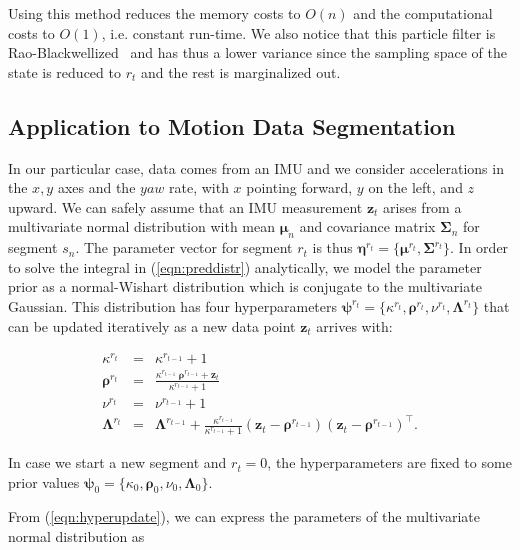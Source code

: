 Using this method reduces the memory costs to $O(n)$ and the computational costs
to $O(1)$, i.e. constant run-time. We also notice that this particle filter is
Rao-Blackwellized~\cite{casella96rao} and has thus a lower variance since the
sampling space of the state is reduced to $r_t$ and the rest is marginalized out.

\subsection{Application to Motion Data Segmentation}
In our particular case, data comes from an IMU and we consider accelerations in
the $x,y$ axes and the $yaw$ rate, with $x$ pointing forward, $y$ on the left,
and $z$ upward. We can safely assume that an IMU measurement $\mathbf{z}_t$
arises from a multivariate normal distribution with mean $\boldsymbol{\mu}_n$
and covariance matrix $\boldsymbol{\Sigma}_n$ for segment $s_n$. The parameter
vector for segment $r_t$ is thus $\boldsymbol{\eta}^{r_{t}}=
\{\boldsymbol{\mu}^{r_{t}},\boldsymbol{\Sigma}^{r_{t}}\}$. In order to solve
the integral in (\ref{eqn:preddistr}) analytically, we model the parameter prior
as a normal-Wishart distribution which is conjugate to the multivariate
Gaussian. This distribution has four hyperparameters
$\boldsymbol{\psi}^{r_{t}}=\{\kappa^{r_{t}},\boldsymbol{\rho}^{r_{t}},
\nu^{r_{t}},\boldsymbol{\Lambda}^{r_{t}}\}$ that can be updated iteratively
as a new data point $\mathbf{z}_t$ arrives with:

\begin{eqnarray}
\label{eqn:hyperupdate}
\kappa^{r_{t}}&=&\kappa^{r_{t-1}}+1\nonumber\\
\boldsymbol{\rho}^{r_{t}}&=&\frac{\kappa^{r_{t-1}}\;
\boldsymbol{\rho}^{r_{t-1}}+\mathbf{z}_t}{\kappa^{r_{t-1}}+1}\nonumber\\
\nu^{r_{t}}&=&\nu^{r_{t-1}}+1\nonumber\\
\boldsymbol{\Lambda}^{r_{t}}&=&\boldsymbol{\Lambda}^{r_{t-1}}+
\frac{\kappa^{r_{t-1}}}{\kappa^{r_{t-1}} + 1}
(\mathbf{z}_t - \boldsymbol{\rho}^{r_{t-1}})
(\mathbf{z}_t - \boldsymbol{\rho}^{r_{t-1}})^\intercal.
\end{eqnarray}

In case we start a new segment and $r_t=0$, the hyperparameters are fixed to
some prior values $\boldsymbol{\psi}_0=\{\kappa_0,\boldsymbol{\rho}_0,\nu_0,
\boldsymbol{\Lambda}_0\}$.

From (\ref{eqn:hyperupdate}), we can express the parameters of the
multivariate normal distribution as

